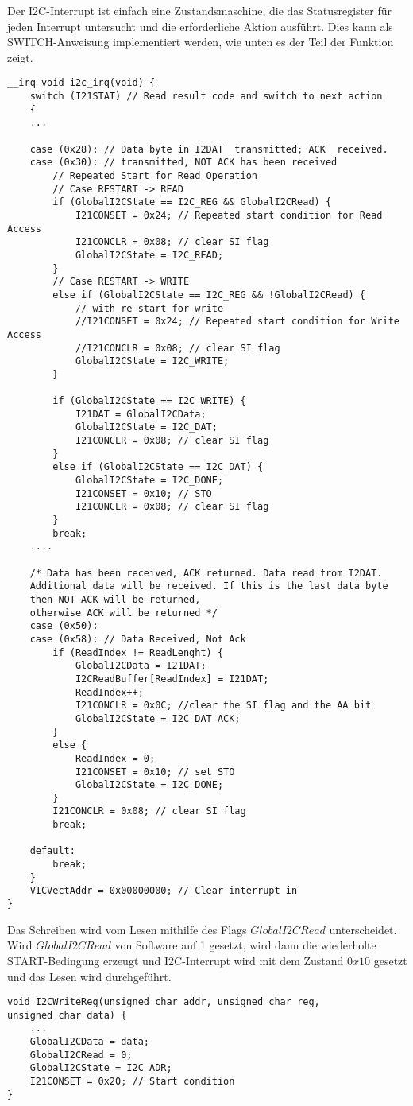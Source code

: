 Der I2C-Interrupt ist einfach eine Zustandsmaschine, die das Statusregister für jeden Interrupt untersucht und die erforderliche Aktion ausführt. Dies kann als SWITCH-Anweisung implementiert werden, wie unten es der Teil der Funktion zeigt.
\begin{lstlisting}
__irq void i2c_irq(void) {
	switch (I21STAT) // Read result code and switch to next action
	{
	...
	
	case (0x28): // Data byte in I2DAT  transmitted; ACK  received.
	case (0x30): // transmitted, NOT ACK has been received
		// Repeated Start for Read Operation
		// Case RESTART -> READ
		if (GlobalI2CState == I2C_REG && GlobalI2CRead) {
			I21CONSET = 0x24; // Repeated start condition for Read Access
			I21CONCLR = 0x08; // clear SI flag
			GlobalI2CState = I2C_READ;
		}
		// Case RESTART -> WRITE
		else if (GlobalI2CState == I2C_REG && !GlobalI2CRead) {
			// with re-start for write
			//I21CONSET = 0x24; // Repeated start condition for Write Access
			//I21CONCLR = 0x08; // clear SI flag
			GlobalI2CState = I2C_WRITE;
		}
		
		if (GlobalI2CState == I2C_WRITE) {
			I21DAT = GlobalI2CData;
			GlobalI2CState = I2C_DAT;
			I21CONCLR = 0x08; // clear SI flag
		}
		else if (GlobalI2CState == I2C_DAT) {
			GlobalI2CState = I2C_DONE;
			I21CONSET = 0x10; // STO
			I21CONCLR = 0x08; // clear SI flag
		}
		break;
	....
	
	/* Data has been received, ACK returned. Data read from I2DAT.
	Additional data will be received. If this is the last data byte 
	then NOT ACK will be returned,
	otherwise ACK will be returned */
	case (0x50):
	case (0x58): // Data Received, Not Ack
		if (ReadIndex != ReadLenght) {
			GlobalI2CData = I21DAT;
			I2CReadBuffer[ReadIndex] = I21DAT;
			ReadIndex++;
			I21CONCLR = 0x0C; //clear the SI flag and the AA bit
			GlobalI2CState = I2C_DAT_ACK;
		}
		else {
			ReadIndex = 0;
			I21CONSET = 0x10; // set STO
			GlobalI2CState = I2C_DONE;
		}
		I21CONCLR = 0x08; // clear SI flag
		break;
	
	default:
		break;
	}	
	VICVectAddr = 0x00000000; // Clear interrupt in
}
\end{lstlisting}

Das Schreiben wird vom Lesen mithilfe des Flags $GlobalI2CRead$ unterscheidet. Wird $GlobalI2CRead$ von Software auf 1 gesetzt, wird dann die wiederholte START-Bedingung erzeugt und I2C-Interrupt wird mit dem Zustand $0x10$ gesetzt und das Lesen wird durchgeführt. 

\begin{lstlisting}
void I2CWriteReg(unsigned char addr, unsigned char reg, 
unsigned char data) {
	...
	GlobalI2CData = data;
	GlobalI2CRead = 0;
	GlobalI2CState = I2C_ADR;
	I21CONSET = 0x20; // Start condition
}
\end{lstlisting}

